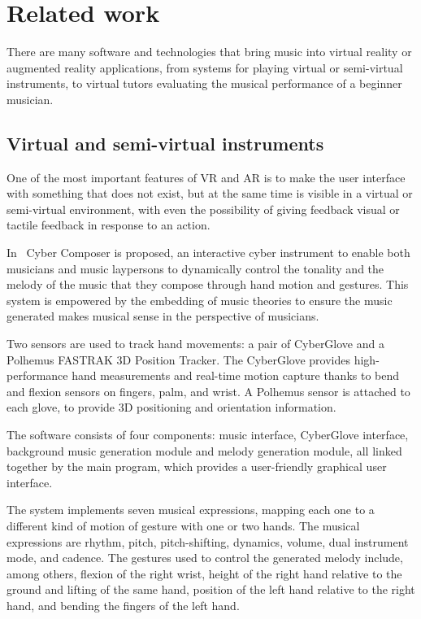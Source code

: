 \section{Related work}\label{sec:related-work}
There are many software and technologies that bring music into virtual reality or augmented reality applications,
from systems for playing virtual or semi-virtual instruments,
to virtual tutors evaluating the musical performance of a beginner musician.

\subsection{Virtual and semi-virtual instruments}\label{subsec:virtual-and-semi-virtual-instruments}
One of the most important features of VR and AR is to make the user interface with something that does not exist,
but at the same time is visible in a virtual or semi-virtual environment, with even the possibility of giving feedback
visual or tactile feedback in response to an action.

In~\cite{cyber-glove} Cyber Composer is proposed, an interactive cyber instrument to enable both musicians and music laypersons
to dynamically control the tonality and the melody of the music that they compose through hand motion and gestures.
This system is empowered by the embedding of music theories to ensure the music
generated makes musical sense in the perspective of musicians.

Two sensors are used to track hand movements: a pair of CyberGlove and a Polhemus FASTRAK 3D Position Tracker.
The CyberGlove provides high-performance hand measurements and real-time motion capture
thanks to bend and flexion sensors on fingers, palm, and wrist.
A Polhemus sensor is attached to each glove, to provide 3D positioning and orientation information.

The software consists of four components:
music interface, CyberGlove interface, background music generation module and melody generation module,
all linked together by the main program, which provides a user-friendly graphical user interface.

The system implements seven musical expressions, mapping each one to a different kind of motion of gesture with one or two hands.
The musical expressions are rhythm, pitch, pitch-shifting, dynamics, volume, dual instrument mode, and cadence.
The gestures used to control the generated melody include, among others, flexion of the right wrist,
height of the right hand relative to the ground and lifting of the same hand,
position of the left hand relative to the right hand, and bending the fingers of the left hand.

